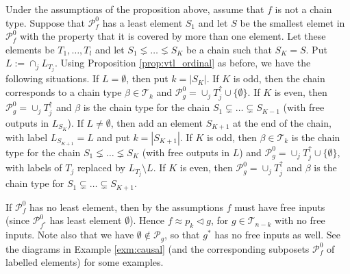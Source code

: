 \documentclass[12pt]{article}
\theoremstyle{definition}
\theoremstyle{remark}
\def\Te{\mathcal T}
\def\Pe{\mathcal P}
\def\vtl{\vartriangleleft}
\begin{document}
Under the assumptions of the proposition above, assume that $f$ is not a chain type. 
Suppose that $\Pe_f^0$ has a least element $S_1$ and let $S$ be the smallest elemet in
$\Pe_f^0$ with the property that it is covered by more than one element. Let these
elements be $T_1,\dots, T_l$ and let  $S_1\lneq \dots \lneq S_K$ be a chain such that $S_K=S$.
Put $L:=\cap_j L_{T_j}$. 
Using
Proposition \ref{prop:vtl_ordinal} as before, we have the following situations. If  $L=\emptyset$, then put  $k=|S_K|$. 
If $K$ is odd, then the chain corresponds to a chain type
$\beta\in \Te_{k}$ and $\Pe_g^0=\cup_j T_j^{\uparrow}\cup\{\emptyset\}$. If $K$ is even, then $\Pe_g^0=\cup_j T_j^{\uparrow}$ and $\beta$
is the chain type for the chain $S_1\subsetneq \dots\subsetneq S_{K-1}$ (with free outputs
in $L_{S_K}$). If $L\ne \emptyset$, then add an element $S_{K+1}$ at the end of the chain, with label
$L_{S_{K+1}}=L$ and put $k=|S_{K+1}|$. If $K$ is odd, then $\beta\in \Te_k$ is the chain type for the chain
$S_1\lneq \dots \lneq S_K$ (with free outputs in $L$) and $\Pe_g^0=\cup_j
T_j^{\uparrow}\cup \{\emptyset\}$, with labels of $T_j$ replaced by $L_{T_j}\setminus L$.  If
$K$ is even, then $\Pe_g^0=\cup_j T_j^{\uparrow}$ and $\beta$ is the chain type  for
$S_1\subsetneq\dots\subsetneq S_{K+1}$.

If $\Pe_f^0$ has no least element, then by the assumptions $f$ must have free inputs (since $\Pe_{f^*}^0$
has least element $\emptyset$). Hence  $f\approx p_k\vtl g$, for $g\in \Te_{n-k}$ with no
free inputs. Note also that we have  $\emptyset
\notin \Pe_g$, so that $g^*$ has no free inputs as well. See the diagrams in Example \ref{exm:causal} (and the corresponding
subposets $\Pe_f^0$ of labelled elements) for some examples.
\end{document}

